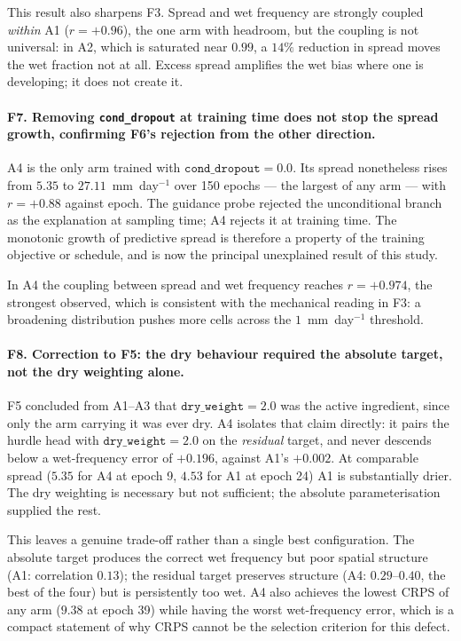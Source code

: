 This result also sharpens F3. Spread and wet frequency are strongly coupled
\emph{within} A1 ($r=+0.96$), the one arm with headroom, but the coupling is not
universal: in A2, which is saturated near $0.99$, a $14\%$ reduction in spread
moves the wet fraction not at all. Excess spread amplifies the wet bias where
one is developing; it does not create it.

\paragraph{F7. Removing \texttt{cond\_dropout} at training time does not stop
the spread growth, confirming F6's rejection from the other direction.} A4 is
the only arm trained with $\texttt{cond\_dropout}=0.0$. Its spread nonetheless
rises from $5.35$ to $27.11$~mm~day$^{-1}$ over 150 epochs --- the largest of any
arm --- with $r=+0.88$ against epoch. The guidance probe rejected the
unconditional branch as the explanation at sampling time; A4 rejects it at
training time. The monotonic growth of predictive spread is therefore a property
of the training objective or schedule, and is now the principal unexplained
result of this study.

In A4 the coupling between spread and wet frequency reaches $r=+0.974$, the
strongest observed, which is consistent with the mechanical reading in F3: a
broadening distribution pushes more cells across the $1$~mm~day$^{-1}$ threshold.

\paragraph{F8. Correction to F5: the dry behaviour required the absolute target,
not the dry weighting alone.} F5 concluded from A1--A3 that
$\texttt{dry\_weight}=2.0$ was the active ingredient, since only the arm
carrying it was ever dry. A4 isolates that claim directly: it pairs the hurdle
head with $\texttt{dry\_weight}=2.0$ on the \emph{residual} target, and never
descends below a wet-frequency error of $+0.196$, against A1's $+0.002$. At
comparable spread ($5.35$ for A4 at epoch 9, $4.53$ for A1 at epoch 24) A1 is
substantially drier. The dry weighting is necessary but not sufficient; the
absolute parameterisation supplied the rest.

This leaves a genuine trade-off rather than a single best configuration. The
absolute target produces the correct wet frequency but poor spatial structure
(A1: correlation $0.13$); the residual target preserves structure (A4:
$0.29$--$0.40$, the best of the four) but is persistently too wet. A4 also
achieves the lowest CRPS of any arm ($9.38$ at epoch 39) while having the worst
wet-frequency error, which is a compact statement of why CRPS cannot be the
selection criterion for this defect.

